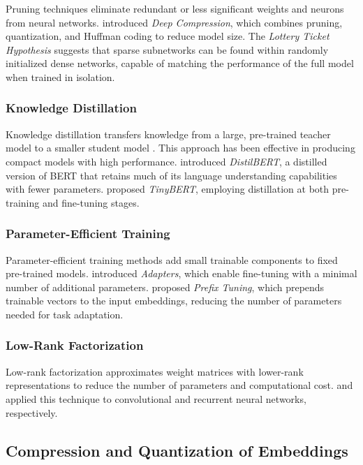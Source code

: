Pruning techniques eliminate redundant or less significant weights and neurons from neural networks. \citet{han2015deep} introduced \textit{Deep Compression}, which combines pruning, quantization, and Huffman coding to reduce model size. The \textit{Lottery Ticket Hypothesis} \cite{frankle2019lottery} suggests that sparse subnetworks can be found within randomly initialized dense networks, capable of matching the performance of the full model when trained in isolation.  
  
\subsubsection{Knowledge Distillation}  
  
Knowledge distillation transfers knowledge from a large, pre-trained teacher model to a smaller student model \cite{hinton2015distilling}. This approach has been effective in producing compact models with high performance. \citet{sanh2019distilbert} introduced \textit{DistilBERT}, a distilled version of BERT that retains much of its language understanding capabilities with fewer parameters. \citet{jiao2020tinybert} proposed \textit{TinyBERT}, employing distillation at both pre-training and fine-tuning stages.  
  
\subsubsection{Parameter-Efficient Training}  
  
Parameter-efficient training methods add small trainable components to fixed pre-trained models. \citet{houlsby2019parameter} introduced \textit{Adapters}, which enable fine-tuning with a minimal number of additional parameters. \citet{li2021prefix} proposed \textit{Prefix Tuning}, which prepends trainable vectors to the input embeddings, reducing the number of parameters needed for task adaptation.  
  
\subsubsection{Low-Rank Factorization}  
  
Low-rank factorization approximates weight matrices with lower-rank representations to reduce the number of parameters and computational cost. \citet{jaderberg2014speeding} and \citet{sainath2013low} applied this technique to convolutional and recurrent neural networks, respectively.  
  
\subsection{Compression and Quantization of Embeddings}  
  

